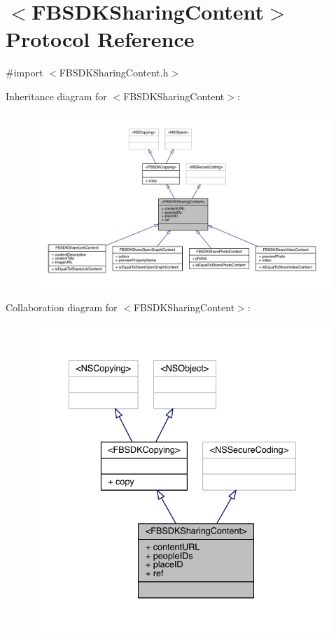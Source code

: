 \hypertarget{protocol_f_b_s_d_k_sharing_content-p}{\section{$<$F\-B\-S\-D\-K\-Sharing\-Content$>$ Protocol Reference}
\label{protocol_f_b_s_d_k_sharing_content-p}
}


{\ttfamily \#import $<$F\-B\-S\-D\-K\-Sharing\-Content.\-h$>$}



Inheritance diagram for $<$F\-B\-S\-D\-K\-Sharing\-Content$>$\-:
\nopagebreak
\begin{figure}[H]
\begin{center}
\leavevmode
\includegraphics[width=350pt]{protocol_f_b_s_d_k_sharing_content-p__inherit__graph}
\end{center}
\end{figure}


Collaboration diagram for $<$F\-B\-S\-D\-K\-Sharing\-Content$>$\-:
\nopagebreak
\begin{figure}[H]
\begin{center}
\leavevmode
\includegraphics[width=336pt]{protocol_f_b_s_d_k_sharing_content-p__coll__graph}
\end{center}
\end{figure}
